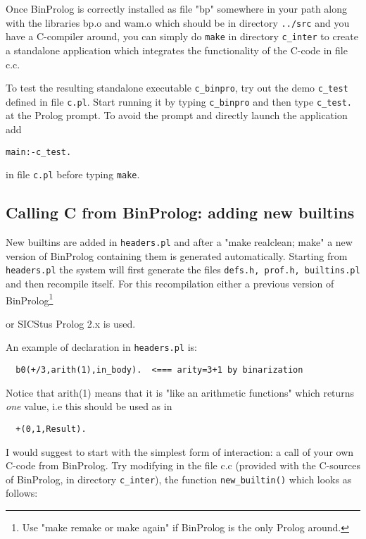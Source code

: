 \documentclass{article}
\begin{document}
Once BinProlog is correctly installed as file "bp" somewhere in
your path along with the libraries bp.o and wam.o which should
be in directory
{\tt ../src} and you have a C-compiler around, you can simply
do {\tt make} in directory {\tt c\_inter} to create a standalone application 
which integrates the functionality of the C-code in file c.c.

To test the resulting standalone executable {\tt c\_binpro}, 
try out the demo {\tt c\_test}
defined in file {\tt c.pl}.
Start running it by typing {\tt c\_binpro}
and then type {\tt c\_test.} at the
Prolog prompt. To avoid the prompt and directly launch
the application add 
\begin{verbatim}
main:-c_test.
\end{verbatim}
in file {\tt c.pl} before typing {\tt make}.


\subsection{Calling C from BinProlog: adding new builtins}

New builtins are added in {\tt headers.pl} and after a "make realclean; make"
a new version of BinProlog containing them is generated automatically.
Starting from {\tt headers.pl} the system will first generate the files
{\tt defs.h, prof.h, builtins.pl} and then recompile itself.
For this recompilation either a previous version of BinProlog\footnote{Use
"make remake or make again" if BinProlog is the only Prolog around.}

or SICStus Prolog 2.x is used.

An example of declaration in {\tt headers.pl} is:

{\small
\begin{verbatim}
  b0(+/3,arith(1),in_body).  <=== arity=3+1 by binarization
\end{verbatim}
}

{\flushleft Notice} that arith(1) means that it is
 "like an arithmetic functions" which returns {\em one} value, i.e this should be used as in

{\small
\begin{verbatim}
  +(0,1,Result).
\end{verbatim}
}

{\flushleft I would} suggest to start with the simplest form of interaction:
a call of your own C-code from BinProlog. Try modifying in the file
c.c (provided with the C-sources of BinProlog,
in directory {\tt c\_inter}),
the function {\tt new\_builtin()} which looks as follows:
\end{document}
